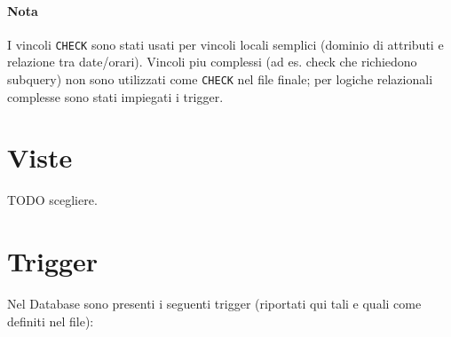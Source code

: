 \documentclass[a4paper,12pt]{report}
\begin{document}
\paragraph{Nota} I vincoli \texttt{CHECK} sono stati usati per vincoli locali semplici (dominio di attributi e relazione tra date/orari). Vincoli piu complessi (ad es. check che richiedono subquery) non sono utilizzati come \texttt{CHECK} nel file finale; per logiche relazionali complesse sono stati impiegati i trigger.

\section{Viste}
TODO scegliere.

\section{Trigger}
Nel Database sono presenti i seguenti trigger (riportati qui tali e quali come definiti nel file):
\end{document}
